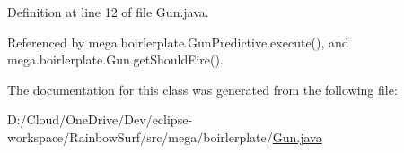 Definition at line 12 of file Gun.\+java.



Referenced by mega.\+boirlerplate.\+Gun\+Predictive.\+execute(), and mega.\+boirlerplate.\+Gun.\+get\+Should\+Fire().



The documentation for this class was generated from the following file\+:\begin{DoxyCompactItemize}
\item 
D\+:/\+Cloud/\+One\+Drive/\+Dev/eclipse-\/workspace/\+Rainbow\+Surf/src/mega/boirlerplate/\hyperlink{_gun_8java}{Gun.\+java}\end{DoxyCompactItemize}
